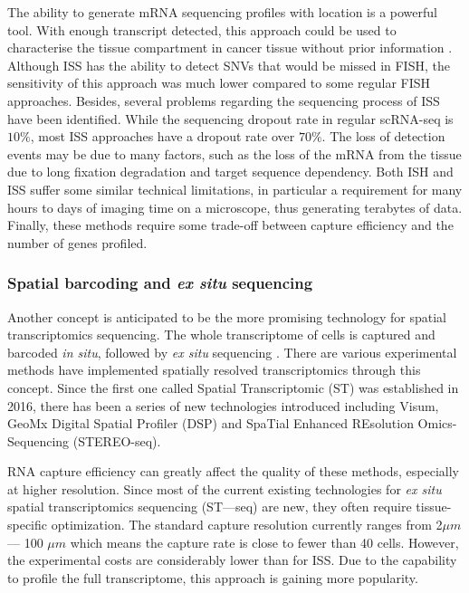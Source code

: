 The ability to generate mRNA sequencing profiles with location is a powerful tool. With enough transcript detected, this approach could be used to characterise the tissue compartment in cancer tissue without prior information  \cite{ke2013situ}. Although ISS has the ability to detect SNVs that would be missed in FISH, the sensitivity of this approach was much lower compared to some regular FISH approaches. Besides, several problems regarding the sequencing process of ISS have been identified. While the sequencing dropout rate in regular scRNA-seq is $10\%$, most ISS approaches have a dropout rate over $70\%$. The loss of detection events may be due to many factors, such as the loss of the
mRNA from the tissue due to long fixation degradation and target sequence dependency. Both ISH and ISS suffer some similar technical limitations, in particular a requirement for many hours to days of imaging time on a microscope, thus generating terabytes of data. Finally, these methods require some trade-off between capture efficiency and the number of genes profiled. 

\subsubsection{Spatial barcoding and \textit{ex situ} sequencing}
Another concept is anticipated to be the more promising technology for spatial transcriptomics sequencing. The whole transcriptome of cells is captured and barcoded \textit{in situ}, followed by \textit{ex situ} sequencing \cite{asp2020spatially}. There are various experimental methods have implemented spatially resolved transcriptomics through this concept. Since the first one called Spatial Transcriptomic (ST) was established in 2016, there has been a series of new technologies introduced including Visum, GeoMx Digital Spatial Profiler (DSP) and SpaTial Enhanced REsolution Omics-Sequencing (STEREO-seq). 

RNA capture efficiency can greatly affect the quality of these methods, especially at higher resolution. Since most of the current existing technologies for \textit{ex situ} spatial transcriptomics sequencing (ST—seq) are new, they often require tissue-specific optimization. The standard capture resolution currently ranges from 2$\mu m$ — 100 $\mu m$ which means the capture rate is close to fewer than 40 cells. However, the experimental costs are considerably lower than for ISS. Due to the capability to profile the full transcriptome, this approach is gaining more popularity.          

